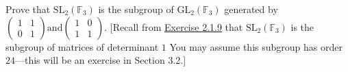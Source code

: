 \begin{exercise} \label{ex2.4.9}
    Prove that $\mathrm{SL}_2(\mathbb{F}_3)$ is the subgroup of $\mathrm{GL}_2(\mathbb{F}_3)$ generated by  
    $
    \begin{pmatrix}
        1 & 1 \\ 
        0 & 1
    \end{pmatrix} \text{and}
    \begin{pmatrix}
        1 & 0 \\ 
        1 & 1
    \end{pmatrix}.
    $
    [Recall from \hyperref[ex2.1.9]{Exercise 2.1.9} that $\mathrm{SL}_2(\mathbb{F}_3)$ is the subgroup of matrices of determinant $1$ You may assume this subgroup has order $24$---this will be an exercise in Section 3.2.]
\end{exercise}

